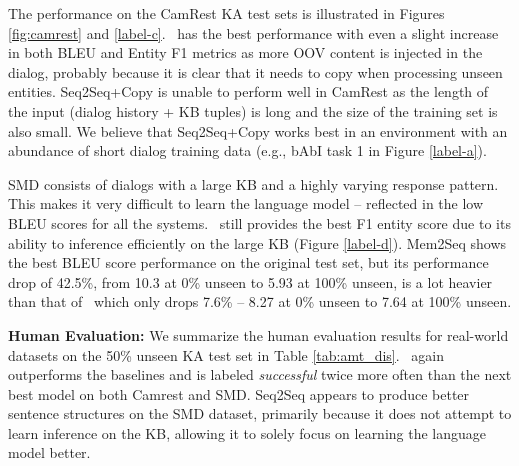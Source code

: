 The performance on the CamRest KA test sets is illustrated in Figures \ref{fig:camrest} and \ref{label-c}. \sys\ has the best performance with even a slight increase in both BLEU and Entity F1 metrics as more OOV content is injected in the dialog, probably because it is clear that it needs to copy when processing unseen entities.
Seq2Seq+Copy is unable to perform well in CamRest as the length of the input (dialog history + KB tuples) is long and the size of the training set is also small. We believe that Seq2Seq+Copy works best in an environment with an abundance of short dialog training data (e.g., bAbI task 1 in Figure \ref{label-a}).

SMD consists of dialogs with a large KB and a highly varying response pattern. This makes it very difficult to learn the language model -- reflected in the low BLEU scores for all the systems. \sys\ still provides the best F1 entity score due to its ability to inference efficiently on the large KB (Figure \ref{label-d}). Mem2Seq shows the best BLEU score performance on the original test set, but its performance drop of 42.5\%, from 10.3 at 0\% unseen to 5.93 at 100\% unseen, is a lot heavier than that of \sys\ which only drops 7.6\% -- 8.27 at 0\% unseen to 7.64 at 100\% unseen.

\noindent \textbf{Human Evaluation:}
We summarize the human evaluation results for real-world datasets on the 50\% unseen KA test set in Table \ref{tab:amt_dis}. \sys\ again outperforms the baselines and is labeled \emph{successful} twice more often than the next best model on both Camrest and SMD. Seq2Seq appears to produce better sentence structures on the SMD dataset, primarily because it does not attempt to learn inference on the KB, allowing it to solely focus on learning the language model better. 

